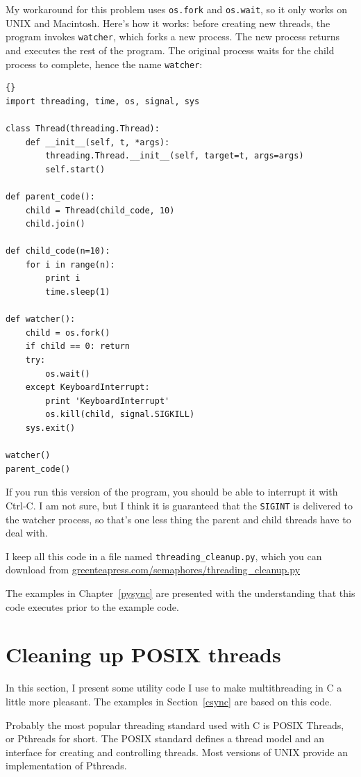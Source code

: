 \documentclass{book}
\begin{document}
My workaround for this problem uses {\tt os.fork} and {\tt os.wait},
so it only works on UNIX and Macintosh.  Here's how it works:
before creating new threads, the program invokes {\tt watcher},
which forks a new process.  The new process returns and executes
the rest of the program.  The original process waits for the
child process to complete, hence the name {\tt watcher}:

\begin{lstlisting}[caption={The watcher}]{}
import threading, time, os, signal, sys

class Thread(threading.Thread):
    def __init__(self, t, *args):
        threading.Thread.__init__(self, target=t, args=args)
        self.start()

def parent_code():
    child = Thread(child_code, 10)
    child.join()

def child_code(n=10):
    for i in range(n):
        print i
        time.sleep(1)

def watcher():
    child = os.fork()
    if child == 0: return
    try:
        os.wait()
    except KeyboardInterrupt:
        print 'KeyboardInterrupt'
        os.kill(child, signal.SIGKILL)
    sys.exit()

watcher()
parent_code()
\end{lstlisting}

If you run this version of the program, you should be able
to interrupt it with Ctrl-C.  I am not sure, but I think it
is guaranteed that the {\tt SIGINT} is delivered to the
watcher process, so that's one less thing the
parent and child threads have to deal with.

I keep all this code in a file named {\tt threading\_cleanup.py},
which you can download from
\url{greenteapress.com/semaphores/threading\_cleanup.py}


The examples in Chapter~\ref{pysync} are presented with the understanding
that this code executes prior to the example code.


\chapter{Cleaning up POSIX threads}
\label{ccleanup}

In this section, I present some utility code I use to make
multithreading in C a little more pleasant.  The examples in
Section~\ref{csync} are based on this code.

Probably the most popular threading standard used with C is
POSIX Threads, or Pthreads for short.  The POSIX standard defines
a thread model and an interface for creating and controlling
threads.  Most versions of UNIX provide an implementation of
Pthreads.
\end{document}
